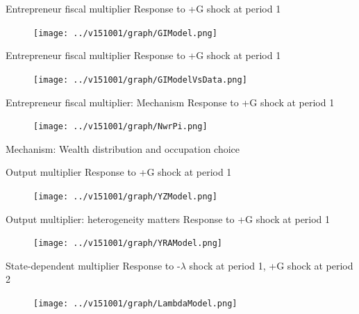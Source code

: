 \documentclass[svgnames]{beamer}
\begin{document}
\begin{frame}{Entrepreneur fiscal multiplier}
{Response to +G shock at period 1}
\begin{figure}[!ht]
\texttt{[image: ../v151001/graph/GIModel.png]}
\end{figure}
\end{frame}

\begin{frame}{Entrepreneur fiscal multiplier}
{Response to +G shock at period 1}
\begin{figure}[!ht]
\texttt{[image: ../v151001/graph/GIModelVsData.png]}
\end{figure}
\end{frame}

\begin{frame}{Entrepreneur fiscal multiplier: Mechanism}
{Response to +G shock at period 1}
\begin{figure}[!ht]
\texttt{[image: ../v151001/graph/NwrPi.png]}
\end{figure}
\end{frame}


\begin{frame}{Mechanism: Wealth distribution and occupation choice}
  \begin{center} 
  \end{center}
\end{frame}

\begin{frame}{Output multiplier}
{Response to +G shock at period 1}
\begin{figure}[!ht]
\texttt{[image: ../v151001/graph/YZModel.png]}
\end{figure}
\end{frame}

\begin{frame}{Output multiplier: heterogeneity matters}
{Response to +G shock at period 1}
\begin{figure}[!ht]
\texttt{[image: ../v151001/graph/YRAModel.png]}
\end{figure}
\end{frame}

\begin{frame}{State-dependent multiplier}
{Response to -$\lambda$ shock at period 1, +G shock at period 2}
\begin{figure}[!ht]
\texttt{[image: ../v151001/graph/LambdaModel.png]}
\end{figure}
\end{frame}
\end{document}
